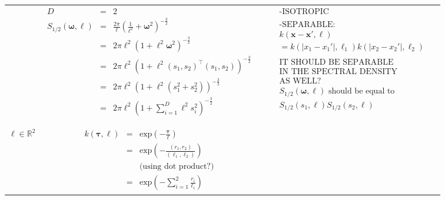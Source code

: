 \documentclass[]{interact}
\theoremstyle{plain}%
\theoremstyle{definition}
\theoremstyle{remark}
\begin{document}
\begin{landscape}
\begin{table}[H]
\begin{center}
\begin{tabular}{|c|c|c|c|}
       & \multicolumn{1}{|p{9.7cm}|}{\small
         \begin{eqnarray*}
		D &=& 2\\
		S_{1/2}(\bm{\omega},\ell) &=& \frac{2\pi}{\ell}\left(\frac{1}{\ell^2}+\bm{\omega}^2 \right)^{-\frac{3}{2}} \\
		&=& 2\pi\ell^2\left(1+\ell^2\bm{\omega}^2\right)^{-\frac{3}{2}} \\
		&=& 2\pi\ell^2\left(1+\ell^2(s_{1},s_{2})^\top(s_{1},s_{2})\right)^{-\frac{3}{2}} \\
		&=& 2\pi\ell^2\left(1+\ell^2(s_{1}^2+s_{2}^2)\right)^{-\frac{3}{2}} \\
		&=& 2\pi\ell^2\left(1+\sum_{i=1}^{D}\ell^2s_{i}^2\right)^{-\frac{3}{2}} \\
         \end{eqnarray*}
       }
       
       & \multicolumn{1}{|p{5.7cm}|}{\small
         \begin{eqnarray*}
        &&\text{-ISOTROPIC}\\
        \\
		&&\text{-SEPARABLE:} \\
		&&k(\bm{x}-\bm{x}',\bm{\ell})\\
		 &&= k(|x_1-x_1'|,\ell_1)k(|x_2-x_2'|,\ell_2)\\
		 \\
		 &&\text{IT SHOULD BE SEPARABLE}\\
		 &&\text{IN THE SPECTRAL DENSITY} \\
		 &&\text{AS WELL?}\\
		&&S_{1/2}(\bm{\omega},\ell) \text{ should be equal to }\\
		 &&S_{1/2}(s_1,\ell)S_{1/2}(s_2,\ell)
         \end{eqnarray*}
       }\\
       \vspace{-10mm}\\
        \cline{1-3}
         
       \multicolumn{1}{|p{1.5cm}|}{
       \vspace{1mm}
       $\bm{\ell} \in \mathbb{R}^2$
       }
       
         & \multicolumn{1}{|p{5.7cm}|}{\small
         \begin{eqnarray*}
		k(\bm{\tau},\bm{\ell}) &=& \mathrm{exp}\left(- \frac{\bm{\tau}}{\bm{\ell}} \right) \\
		&=& \mathrm{exp}\left(- \frac{(r_1, r_2)}{(\ell_1,\ell_2)} \right)\\
		&&\text{(using dot product?)}\\
		&=& \mathrm{exp}\left(- \sum_{i=1}^{2}\frac{r_i}{\ell_i} \right) 
         \end{eqnarray*}
       }
       

\end{tabular}
\end{center}
\end{table}
\end{landscape}
\end{document}
